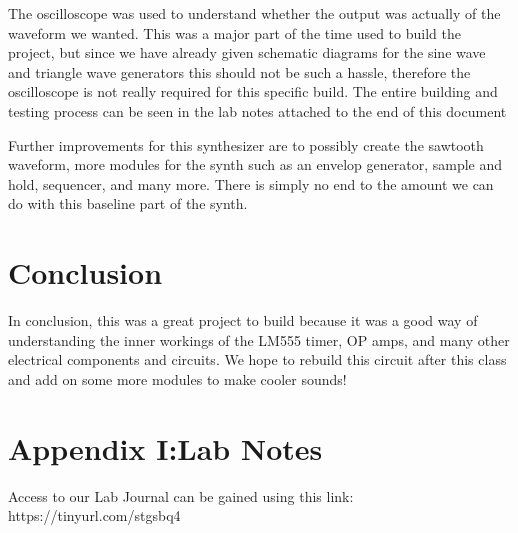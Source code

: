 \documentclass[12pt]{article}
\begin{document}
The oscilloscope was used to understand whether the output was actually of the waveform we wanted. This was a major part of the time used to build the project, but since we have already given schematic diagrams for the sine wave and triangle wave generators this should not be such a hassle, therefore the oscilloscope is not really required for this specific build. The entire building and testing process can be seen in the lab notes attached to the end of this document

Further improvements for this synthesizer are to possibly create the sawtooth waveform, more modules for the synth such as an envelop generator, sample and hold, sequencer, and many more. There is simply no end to the amount we can do with this baseline part of the synth.
\section{Conclusion}
In conclusion, this was a great project to build because it was a good way of understanding the inner workings of the LM555 timer, OP amps, and many other electrical components and circuits. We hope to rebuild this circuit after this class and add on some more modules to make cooler sounds!


\section{Appendix I:Lab Notes}
Access to our Lab Journal can be gained using this link: https://tinyurl.com/stgsbq4
\end{document}
